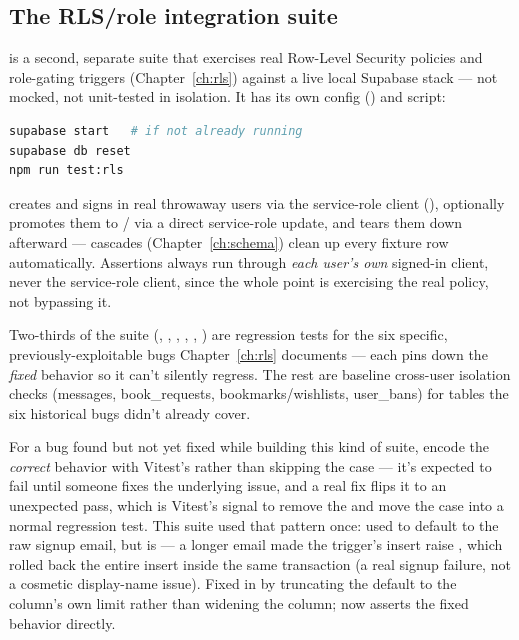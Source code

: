 \subsection{The RLS/role integration suite}
\label{sec:rls-suite}

 is a second, separate suite that exercises real Row-Level Security policies and role-gating triggers (Chapter~\ref{ch:rls}) against a live local Supabase stack — not mocked, not unit-tested in isolation. It has its own config () and script:

\begin{lstlisting}[style=olkcodebash, language=bash, caption={Running the RLS suite locally}]
supabase start   # if not already running
supabase db reset
npm run test:rls
\end{lstlisting}

 creates and signs in real throwaway users via the service-role client (), optionally promotes them to / via a direct service-role  update, and tears them down afterward — cascades (Chapter~\ref{ch:schema}) clean up every fixture row automatically. Assertions always run through \emph{each user's own} signed-in client, never the service-role client, since the whole point is exercising the real policy, not bypassing it.

Two-thirds of the suite (, , , , , ) are regression tests for the six specific, previously-exploitable bugs Chapter~\ref{ch:rls} documents — each pins down the \emph{fixed} behavior so it can't silently regress. The rest are baseline cross-user isolation checks (messages, book\_requests, bookmarks/wishlists, user\_bans) for tables the six historical bugs didn't already cover.

\begin{olknote}
For a bug found but not yet fixed while building this kind of suite, encode the \emph{correct} behavior with Vitest's  rather than skipping the case — it's expected to fail until someone fixes the underlying issue, and a real fix flips it to an unexpected pass, which is Vitest's signal to remove the  and move the case into a normal regression test. This suite used that pattern once:  used to default  to the raw signup email, but  is  — a longer email made the trigger's insert raise , which rolled back the entire  insert inside the same transaction (a real signup failure, not a cosmetic display-name issue). Fixed in  by truncating the default to the column's own limit rather than widening the column;  now asserts the fixed behavior directly.
\end{olknote}

